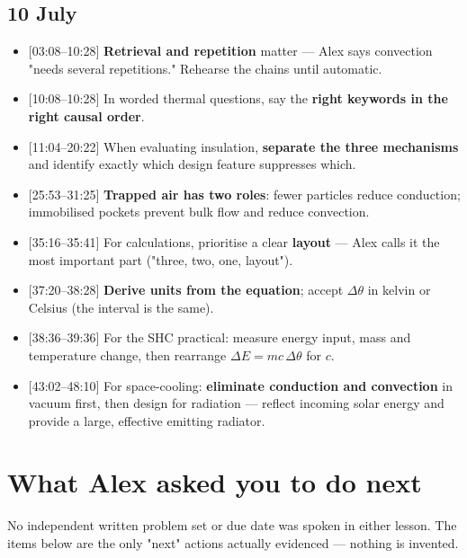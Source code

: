 \documentclass[11pt,a4paper]{article}
\newcommand{\ts}[1]{\textup{[#1]}}       %
\newcommand{\dtheta}{\Delta\theta}
\newcommand{\dE}{\Delta E}
\begin{document}
\subsection{10 July}
\begin{advicebox}
\begin{itemize}[leftmargin=1.3em,itemsep=3pt]
  \item \ts{03:08--10:28} \textbf{Retrieval and repetition} matter --- Alex says convection
        "needs several repetitions." Rehearse the chains until automatic.
  \item \ts{10:08--10:28} In worded thermal questions, say the \textbf{right keywords in the
        right causal order}.
  \item \ts{11:04--20:22} When evaluating insulation, \textbf{separate the three
        mechanisms} and identify exactly which design feature suppresses which.
  \item \ts{25:53--31:25} \textbf{Trapped air has two roles}: fewer particles reduce
        conduction; immobilised pockets prevent bulk flow and reduce convection.
  \item \ts{35:16--35:41} For calculations, prioritise a clear \textbf{layout} --- Alex
        calls it the most important part ("three, two, one, layout").
  \item \ts{37:20--38:28} \textbf{Derive units from the equation}; accept $\dtheta$ in
        kelvin or Celsius (the interval is the same).
  \item \ts{38:36--39:36} For the SHC practical: measure energy input, mass and temperature
        change, then rearrange $\dE = mc\,\dtheta$ for $c$.
  \item \ts{43:02--48:10} For space-cooling: \textbf{eliminate conduction and convection}
        in vacuum first, then design for radiation --- reflect incoming solar energy and
        provide a large, effective emitting radiator.
\end{itemize}
\end{advicebox}

\clearpage
\section{What Alex asked you to do next}

\begin{keybox}
No independent written problem set or due date was spoken in either lesson. The items below
are the only "next" actions actually evidenced --- nothing is invented.
\end{keybox}
\end{document}
